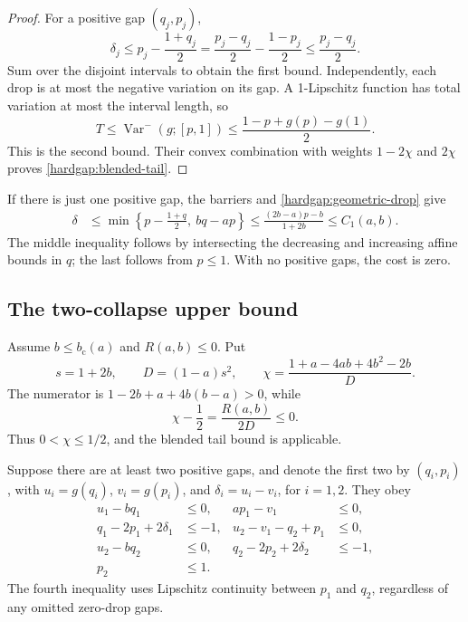 \begin{proof}
For a positive gap \((q_j,p_j)\),
\[
 \delta_j\le p_j-\frac{1+q_j}{2}
 =\frac{p_j-q_j}{2}-\frac{1-p_j}{2}
 \le\frac{p_j-q_j}{2}.
\]
Sum over the disjoint intervals to obtain the first bound. Independently,
each drop is at most the negative variation on its gap. A 1-Lipschitz
function has total variation at most the interval length, so
\[
 T\le\operatorname{Var}^-(g;[p,1])
 \le\frac{1-p+g(p)-g(1)}2.
\]
This is the second bound. Their convex combination with weights
\(1-2\chi\) and \(2\chi\) proves \eqref{hardgap:blended-tail}.
\end{proof}

If there is just one positive gap, the barriers and
\eqref{hardgap:geometric-drop} give
\begin{align}
 \delta
 &\le\min\left\{p-\frac{1+q}{2},\ bq-ap\right\}
 \le\frac{(2b-a)p-b}{1+2b}
 \le C_1(a,b).\label{hardgap:one-gap}
\end{align}
The middle inequality follows by intersecting the decreasing and increasing
affine bounds in \(q\); the last follows from \(p\le1\).
With no positive gaps, the cost is zero.

\subsection{The two-collapse upper bound}
\label{hardgap:low-proof}

Assume \(b\le b_{\mathrm c}(a)\) and \(R(a,b)\le0\). Put
\[
 s=1+2b,\qquad D=(1-a)s^2,\qquad
 \chi=\frac{1+a-4ab+4b^2-2b}{D}.
\]
The numerator is \(1-2b+a+4b(b-a)>0\), while
\begin{equation}\label{hardgap:chi-sign}
 \chi-\frac12=\frac{R(a,b)}{2D}\le0.
\end{equation}
Thus \(0<\chi\le1/2\), and the blended tail bound is applicable.

Suppose there are at least two positive gaps, and denote the first two by
\((q_i,p_i)\), with \(u_i=g(q_i)\), \(v_i=g(p_i)\), and
\(\delta_i=u_i-v_i\), for \(i=1,2\). They obey
\begin{equation}\label{hardgap:low-constraints}
 \begin{aligned}
 u_1-bq_1&\le0,& ap_1-v_1&\le0,\\
 q_1-2p_1+2\delta_1&\le-1,&
 u_2-v_1-q_2+p_1&\le0,\\
 u_2-bq_2&\le0,& q_2-2p_2+2\delta_2&\le-1,\\
 p_2&\le1.&&
 \end{aligned}
\end{equation}
The fourth inequality uses Lipschitz continuity between \(p_1\) and
\(q_2\), regardless of any omitted zero-drop gaps.

